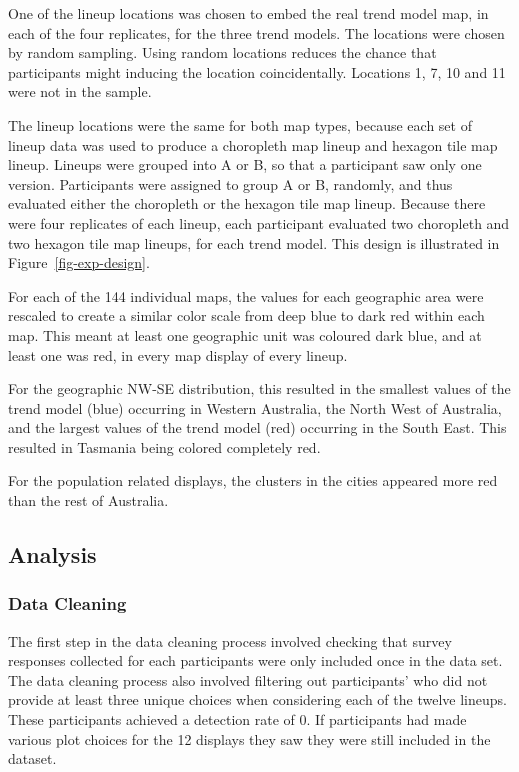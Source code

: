 \documentclass[
doublespace,
  times]{anzsauth}
\begin{document}
One of the lineup locations was chosen to embed the real trend model
map, in each of the four replicates, for the three trend models. The
locations were chosen by random sampling. Using random locations reduces
the chance that participants might inducing the location coincidentally.
Locations 1, 7, 10 and 11 were not in the sample.

The lineup locations were the same for both map types, because each set
of lineup data was used to produce a choropleth map lineup and hexagon
tile map lineup. Lineups were grouped into A or B, so that a participant
saw only one version. Participants were assigned to group A or B,
randomly, and thus evaluated either the choropleth or the hexagon tile
map lineup. Because there were four replicates of each lineup, each
participant evaluated two choropleth and two hexagon tile map lineups,
for each trend model. This design is illustrated in
Figure~\ref{fig-exp-design}.

For each of the 144 individual maps, the values for each geographic area
were rescaled to create a similar color scale from deep blue to dark red
within each map. This meant at least one geographic unit was coloured
dark blue, and at least one was red, in every map display of every
lineup.

For the geographic NW-SE distribution, this resulted in the smallest
values of the trend model (blue) occurring in Western Australia, the
North West of Australia, and the largest values of the trend model (red)
occurring in the South East. This resulted in Tasmania being colored
completely red.

For the population related displays, the clusters in the cities appeared
more red than the rest of Australia.

\subsection{Analysis}\label{analysis}

\subsubsection{Data Cleaning}\label{data-cleaning}

The first step in the data cleaning process involved checking that
survey responses collected for each participants were only included once
in the data set. The data cleaning process also involved filtering out
participants' who did not provide at least three unique choices when
considering each of the twelve lineups. These participants achieved a
detection rate of 0. If participants had made various plot choices for
the 12 displays they saw they were still included in the dataset.
\end{document}
